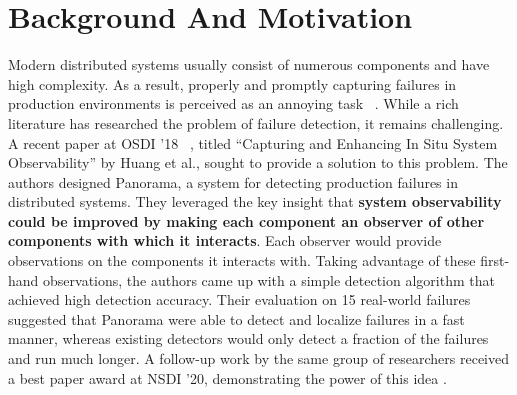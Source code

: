 \section{Background And Motivation}
Modern distributed systems usually consist of numerous components and have high complexity. As a result, properly and promptly capturing failures in production environments is perceived as an annoying task ~\cite{dean2009designs, liu2007wids}. While a rich literature has researched the problem of failure detection, it remains challenging. A recent paper at OSDI '18 ~\cite{huang2018capturing}, titled ``Capturing and Enhancing In Situ System Observability'' by Huang et al., sought to provide a solution to this problem. The authors designed Panorama, a system for detecting production failures in distributed systems. They leveraged the key insight that \textbf{system observability could be improved by making each component an observer of other components with which it interacts}. Each observer would provide observations on the components it interacts with. Taking advantage of these first-hand observations, the authors came up with a simple detection algorithm that achieved high detection accuracy. Their evaluation on 15 real-world failures suggested that Panorama were able to detect and localize failures in a fast manner, whereas existing detectors would only detect a fraction of the failures and run much longer. A follow-up work by the same group of researchers received a best paper award at NSDI '20, demonstrating the power of this idea \cite{246326}.

